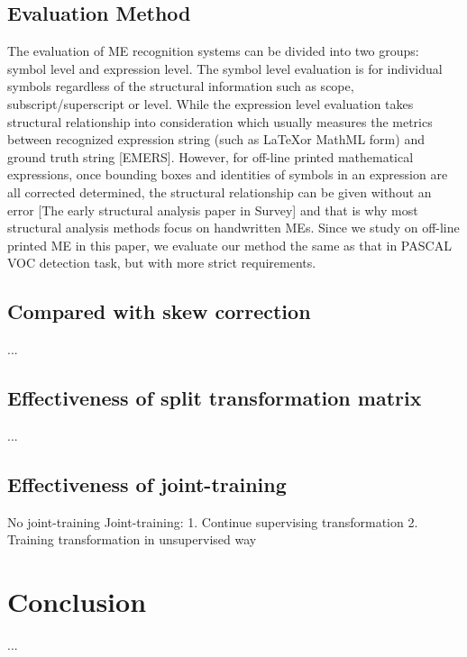\documentclass[10pt,conference,a4paper]{IEEEtran}
\begin{document}
	\subsection{Evaluation Method}
	The evaluation of ME recognition systems can be divided into two groups: symbol level and expression level. The symbol level evaluation is for individual symbols regardless of the structural information such as scope, subscript/superscript or level. While the expression level evaluation takes structural relationship into consideration which usually measures the metrics between recognized expression string (such as \LaTeX or MathML form) and ground truth string [EMERS]. However, for off-line printed mathematical expressions, once bounding boxes and identities of symbols in an expression are all corrected determined, the structural relationship can be given without an error [The early structural analysis paper in Survey] and that is why most structural analysis methods focus on handwritten MEs. %
	Since we study on off-line printed ME in this paper, we evaluate our method the same as that in PASCAL VOC detection task, but with more strict requirements.
	\subsection{Compared with skew correction}
	...
	\subsection{Effectiveness of split transformation matrix}
	...
	\subsection{Effectiveness of joint-training}
	No joint-training
	Joint-training:
		1. Continue supervising transformation
		2. Training transformation in unsupervised way
	
	
	
	\section{Conclusion}
	...
	
\end{document}
